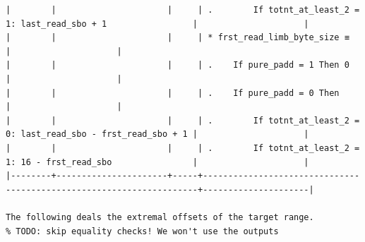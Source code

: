 \documentclass[varwidth=\maxdimen,margin=0.5cm,multi={verbatim}]{standalone}
\begin{document}
\begin{verbatim}
|        |                      |     | .        If totnt_at_least_2 = 1: last_read_sbo + 1                 |                     |
|        |                      |     | * frst_read_limb_byte_size ≡                                        |                     |
|        |                      |     | .    If pure_padd = 1 Then 0                                        |                     |
|        |                      |     | .    If pure_padd = 0 Then                                          |                     |
|        |                      |     | .        If totnt_at_least_2 = 0: last_read_sbo - frst_read_sbo + 1 |                     |
|        |                      |     | .        If totnt_at_least_2 = 1: 16 - frst_read_sbo                |                     |
|--------+----------------------+-----+---------------------------------------------------------------------+---------------------|

The following deals the extremal offsets of the target range.
% TODO: skip equality checks! We won't use the outputs


\end{verbatim}
\end{document}
